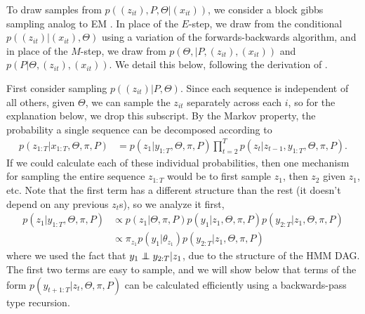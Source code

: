 \documentclass{article}
\begin{document}
To draw samples from $p\left(\left(z_{it}\right), P, \Theta \vert
\left(x_{it}\right)\right)$, we consider a block gibbs sampling analog to EM
\citep{fruhwirth2006finite}. In place of the $E$-step, we draw from the
conditional $p\left(\left(z_{it}\right) \vert \left(x_{it}\right),
\Theta\right)$ using a variation of the forwards-backwards algorithm, and in
place of the $M$-step, we draw from $p\left(\Theta, \vert P, \left(z_{it}\right),
\left(x_{it}\right)\right)$ and $p\left(P \vert \Theta, \left(z_{it}\right),
\left(x_{it}\right)\right)$. We detail this below, following the derivation of
\citep{fox2009bayesian}.

First consider sampling $p\left(\left(z_{it}\right) \vert P, \Theta\right)$.
Since each sequence is independent of all others, given $\Theta$, we can sample
the $z_{it}$ separately across each $i$, so for the explanation below, we drop
this subscript. By the Markov property, the probability a single sequence can be
decomposed according to
\begin{align}
  \label{eq:sticky_block_z}
p\left(z_{1:T} \vert x_{1:T}, \Theta, \pi, P\right) &= p\left(z_{1} \vert y_{1:T}, \Theta, \pi, P\right) \prod_{t = 2}^{T} p\left(z_{t} \vert z_{t - 1}, y_{1:T}, \Theta, \pi, P\right).
\end{align}
If we could calculate each of these individual probabilities, then one mechanism
for sampling the entire sequence $z_{1:T}$ would be to first sample $z_{1}$,
then $z_{2}$ given $z_{1}$, etc. Note that the first term has a different
structure than the rest (it doesn't depend on any previous $z_{t}$s), so we
analyze it first,
\begin{align*}
  p\left(z_{1} \vert y_{1:T}, \Theta, \pi, P\right) &\propto p\left(z_{1} \vert \Theta, \pi, P\right) p\left(y_{1} \vert z_{1}, \Theta, \pi, P\right) p\left(y_{2:T} \vert z_{1}, \Theta, \pi, P\right) \\
  &\propto \pi_{z_{1}} p\left(y_{1} \vert \theta_{z_{1}}\right) p\left(y_{2:T} \vert z_{1}, \Theta, \pi, P\right)
\end{align*}
where we used the fact that $y_{1} \independent y_{2:T} \vert z_{1}$, due to the
structure of the HMM DAG. The first two terms are easy to sample, and we will
show below that terms of the form $p\left(y_{t + 1:T} \vert z_{t}, \Theta, \pi,
P\right)$ can be calculated efficiently using a backwards-pass type recursion.
\end{document}
